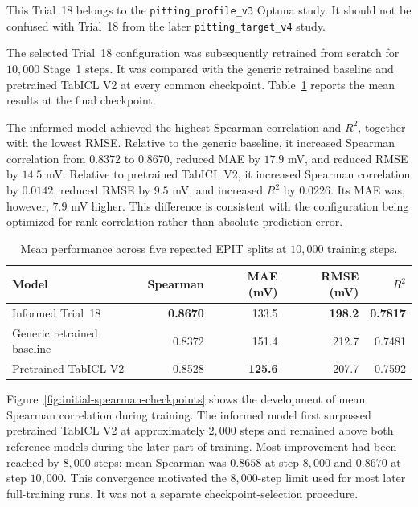\documentclass{article}
\begin{document}
This Trial~18 belongs to the \texttt{pitting\_profile\_v3} Optuna study. It should not be confused with Trial~18 from the later \texttt{pitting\_target\_v4} study.

The selected Trial~18 configuration was subsequently retrained from scratch for \(10{,}000\) Stage~1 steps. It was compared with the generic retrained baseline and pretrained TabICL V2 at every common checkpoint. Table~\ref{tab:initial-informed-results} reports the mean results at the final checkpoint.

The informed model achieved the highest Spearman correlation and \(R^2\), together with the lowest RMSE. Relative to the generic baseline, it increased Spearman correlation from \(0.8372\) to \(0.8670\), reduced MAE by \(17.9\) mV, and reduced RMSE by \(14.5\) mV. Relative to pretrained TabICL V2, it increased Spearman correlation by \(0.0142\), reduced RMSE by \(9.5\) mV, and increased \(R^2\) by \(0.0226\). Its MAE was, however, \(7.9\) mV higher. This difference is consistent with the configuration being optimized for rank correlation rather than absolute prediction error.

\begin{table}[htbp]
\centering
\caption{Mean performance across five repeated EPIT splits at \(10{,}000\) training steps.}
\label{tab:initial-informed-results}
\begin{tabular}{lrrrr}
\hline
Model & Spearman & MAE (mV) & RMSE (mV) & \(R^2\) \\
\hline
Informed Trial~18
    & \textbf{0.8670} & 133.5 & \textbf{198.2} & \textbf{0.7817} \\
Generic retrained baseline
    & 0.8372 & 151.4 & 212.7 & 0.7481 \\
Pretrained TabICL V2
    & 0.8528 & \textbf{125.6} & 207.7 & 0.7592 \\
\hline
\end{tabular}
\end{table}

Figure~\ref{fig:initial-spearman-checkpoints} shows the development of mean Spearman correlation during training. The informed model first surpassed pretrained TabICL V2 at approximately \(2{,}000\) steps and remained above both reference models during the later part of training. Most improvement had been reached by \(8{,}000\) steps: mean Spearman was \(0.8658\) at step \(8{,}000\) and \(0.8670\) at step \(10{,}000\). This convergence motivated the \(8{,}000\)-step limit used for most later full-training runs. It was not a separate checkpoint-selection procedure.
\end{document}

